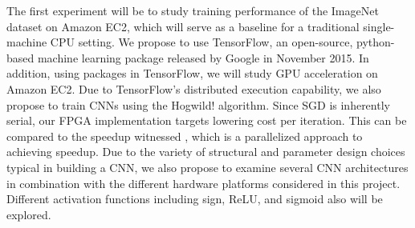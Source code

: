 The first experiment will be to study training performance of the ImageNet dataset on Amazon EC2, which will serve as a baseline for a traditional single-machine CPU setting.  We propose to use TensorFlow, an open-source, python-based machine learning package released by Google in November 2015.  In addition, using packages in TensorFlow, we will study GPU acceleration on Amazon EC2.  Due to TensorFlow’s distributed execution capability, we also propose to train CNNs using the Hogwild! algorithm.  Since SGD is inherently serial, our FPGA implementation targets lowering cost per iteration.  This can be compared to the speedup witnessed , which is a parallelized approach to achieving speedup.  Due to the variety of structural and parameter design choices typical in building a CNN, we also propose to examine several CNN architectures in combination with the different hardware platforms considered in this project.  Different activation functions including sign, ReLU, and sigmoid also will be explored.

